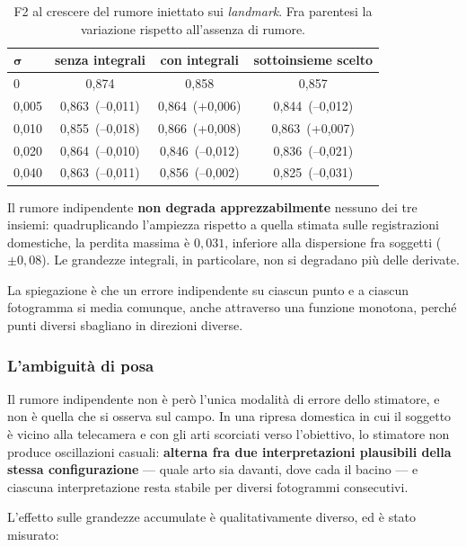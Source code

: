 \begin{table}[ht]
\centering
\caption{F2 al crescere del rumore iniettato sui \emph{landmark}. Fra parentesi
la variazione rispetto all'assenza di rumore.}
\label{tab:rumore}
\begin{tabular}{lccc}
\hline
$\boldsymbol{\sigma}$ & \textbf{senza integrali} & \textbf{con integrali} & \textbf{sottoinsieme scelto} \\
\hline
0     & 0,874 & 0,858 & 0,857 \\
0,005 & 0,863 \,(--0,011) & 0,864 \,(+0,006) & 0,844 \,(--0,012) \\
0,010 & 0,855 \,(--0,018) & 0,866 \,(+0,008) & 0,863 \,(+0,007) \\
0,020 & 0,864 \,(--0,010) & 0,846 \,(--0,012) & 0,836 \,(--0,021) \\
0,040 & 0,863 \,(--0,011) & 0,856 \,(--0,002) & 0,825 \,(--0,031) \\
\hline
\end{tabular}
\end{table}

Il rumore indipendente \textbf{non degrada apprezzabilmente} nessuno dei tre
insiemi: quadruplicando l'ampiezza rispetto a quella stimata sulle
registrazioni domestiche, la perdita massima è $0{,}031$, inferiore alla
dispersione fra soggetti ($\pm 0{,}08$). Le grandezze integrali, in
particolare, non si degradano più delle derivate.

La spiegazione è che un errore indipendente su ciascun punto e a ciascun
fotogramma si media comunque, anche attraverso una funzione monotona, perché
punti diversi sbagliano in direzioni diverse.

\subsubsection*{L'ambiguità di posa}

Il rumore indipendente non è però l'unica modalità di errore dello stimatore,
e non è quella che si osserva sul campo. In una ripresa domestica in cui il
soggetto è vicino alla telecamera e con gli arti scorciati verso l'obiettivo,
lo stimatore non produce oscillazioni casuali: \textbf{alterna fra due
interpretazioni plausibili della stessa configurazione} --- quale arto sia
davanti, dove cada il bacino --- e ciascuna interpretazione resta stabile per
diversi fotogrammi consecutivi.

L'effetto sulle grandezze accumulate è qualitativamente diverso, ed è stato
misurato:

